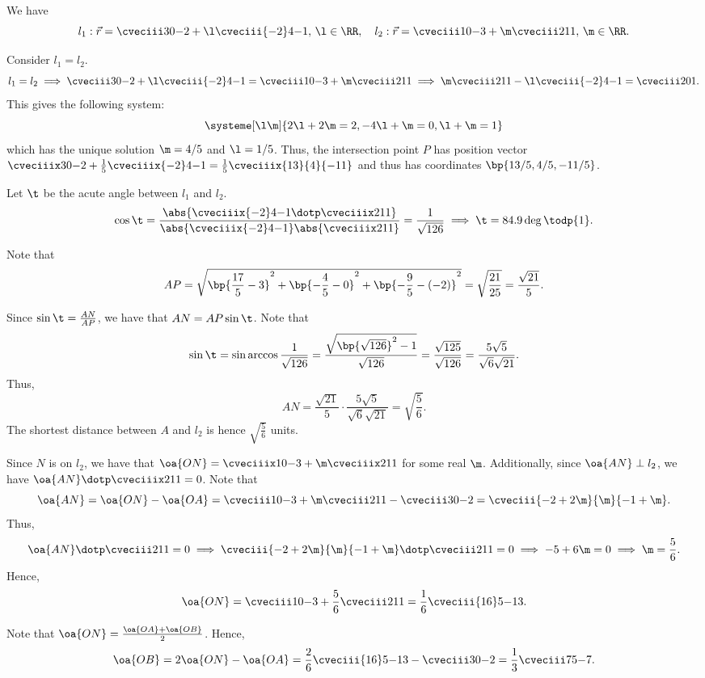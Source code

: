 \begin{solution}
    We have \[l_1 : \vec r = \cveciii30{-2} + \l\cveciii{-2}4{-1}, \, \l \in \RR, \quad l_2 : \vec r = \cveciii10{-3} + \m\cveciii211, \, \m \in \RR.\]

    \begin{ppart}
        Consider $l_1 = l_2$. \[l_1 = l_2 \implies \cveciii30{-2} + \l\cveciii{-2}4{-1} = \cveciii10{-3} + \m\cveciii211 \implies \m\cveciii211 - \l\cveciii{-2}4{-1} = \cveciii201.\] This gives the following system: \[\systeme[\l\m]{2\l+2\m=2,{-4\l}+{\m}=0,{\l}+{\m}=1}\] which has the unique solution $\m = 4/5$ and $\l = 1/5$. Thus, the intersection point $P$ has position vector $\cveciiix30{-2} + \frac15\cveciiix{-2}4{-1} = \frac15\cveciiix{13}{4}{-11}$ and thus has coordinates $\bp{13/5, 4/5, -11/5}$.
    \end{ppart}
    \begin{ppart}
        Let $\t$ be the acute angle between $l_1$ and $l_2$. \[\cos\t = \frac{\abs{\cveciiix{-2}4{-1} \dotp \cveciiix211}}{\abs{\cveciiix{-2}4{-1}} \abs{\cveciiix211}} = \frac1{\sqrt{126}} \implies \t = 84.9\deg \todp{1}.\]

        Note that \[AP = \sqrt{\bp{\frac{17}5 - 3}^2 + \bp{-\frac45 - 0}^2 + \bp{-\frac95 - (-2)}^2} = \sqrt{\frac{21}{25}} = \frac{\sqrt{21}}5.\]

        Since $\sin\t = \frac{AN}{AP}$, we have that $AN = AP\sin\t$. Note that \[\sin\t = \sin \arccos \frac1{\sqrt{126}} = \frac{\sqrt{\bp{\sqrt{126}}^2 - 1}}{\sqrt{126}} = \frac{\sqrt{125}}{\sqrt{126}} = \frac{5\sqrt5}{\sqrt6 \sqrt{21}}.\] Thus, \[AN = \frac{\sqrt{21}}5 \cdot \frac{5\sqrt5}{\sqrt6 \sqrt{21}} = \sqrt{\frac56}.\] The shortest distance between $A$ and $l_2$ is hence $\sqrt{\frac56}$ units.
    \end{ppart}
    \begin{ppart}
        Since $N$ is on $l_2$, we have that $\oa{ON}= \cveciiix10{-3} + \m\cveciiix211$ for some real $\m$. Additionally, since $\oa{AN} \perp l_2$, we have $\oa{AN} \dotp \cveciiix211 = 0$. Note that \[\oa{AN} = \oa{ON} - \oa{OA} = \cveciii10{-3} + \m\cveciii211 - \cveciii30{-2} = \cveciii{-2+2\m}{\m}{-1+\m}.\] Thus,  \[\oa{AN} \dotp \cveciii211 = 0 \implies \cveciii{-2+2\m}{\m}{-1+\m} \dotp \cveciii211 = 0 \implies -5 + 6\m = 0 \implies \m = \frac56.\] Hence, \[\oa{ON} = \cveciii10{-3} + \frac56 \cveciii211 = \frac16 \cveciii{16}5{-13}.\]

        Note that $\oa{ON} = \frac{\oa{OA} + \oa{OB}}2$. Hence, \[\oa{OB} = 2\oa{ON} - \oa{OA} = \frac26\cveciii{16}5{-13} - \cveciii30{-2} = \frac13\cveciii75{-7}.\]
    \end{ppart}
\end{solution}